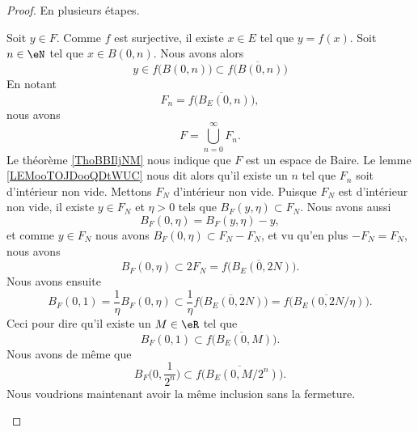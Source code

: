 \begin{proof}
	En plusieurs étapes.
	\begin{subproof}
		Soit \( y\in F\). Comme \( f\) est surjective, il existe \( x\in E\) tel que \( y=f(x)\). Soit \( n\in \eN\) tel que \( x\in B(0,n)\). Nous avons alors
		\begin{equation}
			y\in f\big( B(0,n) \big)\subset \overline{ f\big( B(0,n) \big) }
		\end{equation}
		En notant
		\begin{equation}
			F_n=\overline{ f\big( B_E(0,n) \big) },
		\end{equation}
		nous avons
		\begin{equation}
			F=\bigcup_{n=0}^{\infty}F_n.
		\end{equation}
		Le théorème \ref{ThoBBIljNM} nous indique que \( F\) est un espace de Baire. Le lemme \ref{LEMooTOJDooQDtWUC} nous dit alors qu'il existe un \( n\) tel que \( F_n\) soit d'intérieur non vide. Mettons \( F_N\) d'intérieur non vide.
		Puisque \( F_N\) est d'intérieur non vide, il existe \( y\in F_N\) et \( \eta>0\) tels que \( B_F(y,\eta)\subset F_N\). Nous avons aussi
		\begin{equation}
			B_F(0,\eta)=B_F(y,\eta)-y,
		\end{equation}
		et comme \( y\in F_N\) nous avons \( B_F(0,\eta)\subset F_N-F_N\), et vu qu'en plus \( -F_N=F_N\), nous avons
		\begin{equation}
			B_F(0,\eta)\subset 2F_N=\overline{ f\big( B_E(0,2N) \big) }.
		\end{equation}
		Nous avons ensuite
		\begin{equation}
			B_F(0,1)=\frac{1}{ \eta }B_F(0,\eta)\subset\frac{1}{ \eta }\overline{ f\big( B_E(0,2N) \big) }=\overline{ f\big( B_E(0,2N/\eta) \big) }.
		\end{equation}
		Ceci pour dire qu'il existe un \( M\in \eR\) tel que
		\begin{equation}
			B_F(0,1)\subset \overline{ f\big( B_E(0,M) \big) }.
		\end{equation}
		Nous avons de même que
		\begin{equation}        \label{EQooCMSPooYtzAuC}
			B_F\big( 0,\frac{1}{ 2^n } \big)\subset \overline{ f\big( B_E(0,M/2^n) \big) }.
		\end{equation}
		Nous voudrions maintenant avoir la même inclusion sans la fermeture.


\end{subproof}
\end{proof}
